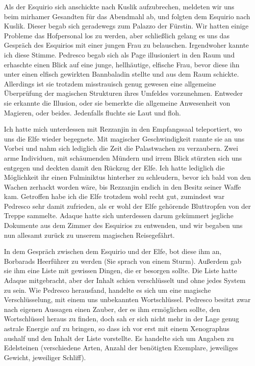 Als der Esquirio sich anschickte nach Kuslik aufzubrechen, meldeten wir uns beim mirhamer Gesandten für das Abendmahl ab, und folgten dem Esquirio nach Kuslik. Dieser begab sich geradewegs zum Palazzo der Fürstin. Wir hatten einige Probleme das Hofpersonal los zu werden, aber schließlich gelang es uns das Gespräch des Esquirios mit einer jungen Frau zu belauschen. Irgendwoher kannte ich diese Stimme. Pedresco begab sich als Page illusioniert in den Raum und erhaschte einen Blick auf eine junge, hellhäutige, elfische Frau, bevor diese ihn unter einen elfisch gewirkten Bannbaladin stellte und aus dem Raum schickte. Allerdings ist sie trotzdem misstrauisch genug gewesen eine allgemeine Überprüfung der magischen Strukturen ihres Umfeldes vorzunehmen. Entweder sie erkannte die Illusion, oder sie bemerkte die allgemeine Anwesenheit von Magieren, oder beides. Jedenfalls fluchte sie Laut und floh.

Ich hatte mich unterdessen mit Rezzanjin in den Empfangssaal teleportiert, wo uns die Elfe wieder begegnete. Mit magischer Geschwindigkeit rannte sie an uns Vorbei und nahm sich lediglich die Zeit die Palastwachen zu verzaubern. Zwei arme Individuen, mit schäumenden Mündern und irrem Blick stürzten sich uns entgegen und deckten damit den Rückzug der Elfe. Ich hatte lediglich die Möglichkeit ihr einen Fulminiktus hinterher zu schleudern, bevor ich bald von den Wachen zerhackt worden wäre, bis Rezzanjin endich in den Besitz seiner Waffe kam. Getroffen habe ich die Elfe trotzdem wohl recht gut, zumindest war Pedresco sehr damit zufrieden, als er wohl der Elfe gehörende Bluttropfen von der Treppe sammelte.
Adaque hatte sich unterdessen darum gekümmert jegliche Dokumente aus dem Zimmer des Esquirios zu entwenden, und wir begaben uns nun allesamt zurück zu unserem magischen Reisegefährt.

In dem Gespräch zwischen dem Esquirio und der Elfe, bot diese ihm an, Borbarads Heerführer zu werden (Sie sprach von einem Sturm). Außerdem gab sie ihm eine Liste mit gewissen Dingen, die er besorgen sollte. Die Liste hatte Adaque mitgebracht, aber der Inhalt schien verschlüsselt und ohne jedes System zu sein. Wie Pedresco herausfand, handelte es sich um eine magische Verschlüsselung, mit einem uns unbekannten Wortschlüssel. Pedresco besitzt zwar nach eigenen Aussagen einen Zauber, der es ihm ermöglichen sollte, den Wortschlüssel heraus zu finden, doch sah er sich nicht mehr in der Lage genug astrale Energie auf zu bringen, so dass ich vor erst mit einem Xenographus aushalf und den Inhalt der Liste vorstellte. Es handelte sich um Angaben zu Edelsteinen (verschiedene Arten, Anzahl der benötigten Exemplare, jeweiliges Gewicht, jeweiliger Schliff).

